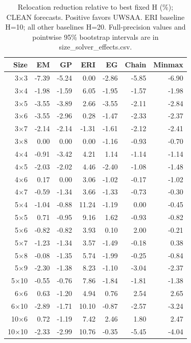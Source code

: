\begin{table}[t]
\centering\scriptsize
\caption{Relocation reduction relative to best fixed H (\%); CLEAN forecasts. Positive favors UWSAA. ERI baseline H=10; all other baselines H=20. Full-precision values and pointwise 95\% bootstrap intervals are in size_solver_effects.csv.}
\setlength{\tabcolsep}{4pt}
\begin{tabular}{rrrrrrr}
\toprule
Size & EM & GP & ERI & EG & Chain & Minmax \\
\midrule
3$\times$3 & -7.39 & -5.24 & 0.00 & -2.86 & -5.85 & -6.90 \\
3$\times$4 & -1.98 & -1.59 & 6.05 & -1.95 & -1.57 & -1.98 \\
3$\times$5 & -3.55 & -3.89 & 2.66 & -3.55 & -2.11 & -2.84 \\
3$\times$6 & -3.55 & -2.96 & 0.28 & -1.47 & -2.33 & -2.37 \\
3$\times$7 & -2.14 & -2.14 & -1.31 & -1.61 & -2.12 & -2.41 \\
3$\times$8 & 0.00 & 0.00 & 0.00 & -1.16 & -0.93 & -0.70 \\
4$\times$4 & -0.91 & -3.42 & 4.21 & 1.14 & -1.14 & -1.14 \\
4$\times$5 & -2.03 & -2.02 & 4.46 & -2.40 & -1.08 & -1.48 \\
4$\times$6 & 0.17 & 0.00 & 3.06 & -1.02 & -0.17 & -1.02 \\
4$\times$7 & -0.59 & -1.34 & 3.66 & -1.33 & -0.73 & -0.30 \\
5$\times$4 & -1.04 & -0.88 & 11.24 & -1.19 & 0.00 & -0.45 \\
5$\times$5 & 0.71 & -0.95 & 9.16 & 1.62 & -0.93 & -0.82 \\
5$\times$6 & -0.82 & -0.82 & 3.93 & 0.10 & 2.00 & -0.21 \\
5$\times$7 & -1.23 & -1.34 & 3.57 & -1.49 & -0.18 & 0.38 \\
5$\times$8 & -0.08 & -1.35 & 5.74 & -1.99 & -0.25 & -0.84 \\
5$\times$9 & -2.30 & -1.38 & 8.23 & -1.10 & -3.04 & -2.37 \\
5$\times$10 & -0.55 & -0.76 & 7.86 & -1.84 & -1.81 & -1.38 \\
6$\times$6 & 0.63 & -1.20 & 4.94 & 0.76 & 2.54 & 2.65 \\
6$\times$10 & -2.89 & -1.71 & 10.10 & -0.87 & -2.57 & -3.24 \\
10$\times$6 & 0.72 & -1.19 & 7.42 & 2.46 & 1.80 & 2.47 \\
10$\times$10 & -2.33 & -2.99 & 10.76 & -0.35 & -5.45 & -4.04 \\
\bottomrule
\end{tabular}
\end{table}